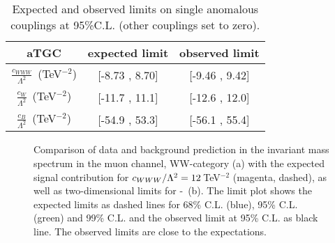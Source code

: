 \begin{table}
	\centering
	\caption[Expected and observed limits on single anomalous couplings at 95\%C.L.]{Expected and observed limits on single anomalous couplings at 95\%C.L. (other couplings set to zero).}
	\label{tab:conclusion:1d}
	\begin{tabular}{ccc}
	\hline
	aTGC              &     expected limit & observed limit\\
	\hline
	$\frac{c_{WWW}}{\Lambda ^2}$~(TeV$^{-2}$) &  [-8.73 , 8.70] &  [-9.46 , 9.42] \\
	$\frac{c_{W}}{\Lambda ^2}$~(TeV$^{-2}$)   &  [-11.7 , 11.1] &  [-12.6 , 12.0] \\
	$\frac{c_{B}}{\Lambda ^2}$~(TeV$^{-2}$)   & [-54.9 , 53.3] &  [-56.1 , 55.4] \\
	\hline
	\end{tabular}
\end{table}

\begin{figure}
    \centering
    \resizebox{\columnwidth}{!}
    {%
    \caption[Comparison of data and background prediction as well as two-dimensional limits for \Tccw -\Tcb]{Comparison of data and background prediction in the invariant mass spectrum in the muon channel, WW-category (a) with the expected signal contribution for $c_{WWW}/\Lambda^2=12$\,TeV$^{-2}$ (magenta, dashed), as well as two-dimensional limits for \Tccw -\Tcb \ (b). The limit plot shows the expected limits as dashed lines for 68\% C.L. (blue), 95\% C.L. (green) and 99\% C.L. and the observed limit at 95\% C.L. as black line. The observed limits are close to the expectations.}
    \label{fig:conclusion}
    }
\end{figure}